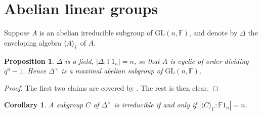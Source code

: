 \documentclass[12pt]{amsart}
\newtheorem{lemma}[theorem]{Lemma}
\newtheorem{proposition}[theorem]{Proposition}
\newtheorem{corollary}[theorem]{Corollary}
\theoremstyle{definition}
\theoremstyle{remark}
\begin{document}
\section{Abelian linear groups}
\label{ablin}

 Suppose $A$ is an abelian irreducible subgroup of 
 $\mathrm{\mathrm{GL}}(n, \mathbb{F})$, and   
 denote by $\Delta$ the enveloping algebra 
 $\langle A  \rangle _\mathbb{F}$ of $A$.
\begin{proposition}
\label{singdef}
 $\Delta$ is a field, $|\Delta : \mathbb{F}1_n| =n$,
 so that $A$ is cyclic of order dividing $q^n-1$. 
 Hence  $\Delta^{\! \times}$ is a maximal abelian  
 subgroup of $\mathrm{GL}(n, \mathbb{F})$.
\end{proposition}
\begin{proof}
 The first two claims are covered by 
 \cite[Theorem 4, p.99]{Suprunenko}. The rest is then clear.
\end{proof}
\begin{corollary}
 A subgroup $C$ of $\Delta^{\! \times}$ is irreducible if 
 and only if
 $|\langle C \rangle_{\mathbb{F}} : \mathbb{F}1_n| =n$.
\end{corollary} 
% 
\end{document}
